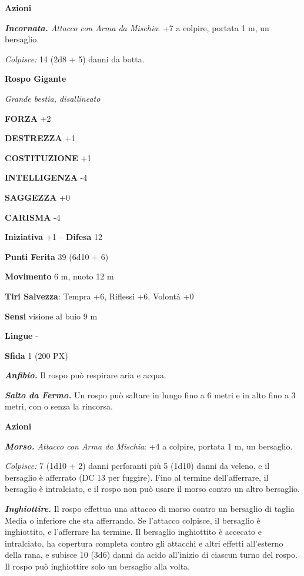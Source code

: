 \begin{multicols}{2}
\textbf{Azioni}

\textit{\textbf{Incornata.} Attacco con Arma da Mischia}: +7 a colpire, portata 1 m, un bersaglio.

\textit{Colpisce:} 14 (2d8 + 5) danni da botta.

\medskip\textbf{Rospo Gigante}

\textit{Grande bestia, disallineato}

\textbf{FORZA} +2

\textbf{DESTREZZA} +1

\textbf{COSTITUZIONE} +1

\textbf{INTELLIGENZA} -4

\textbf{SAGGEZZA} +0

\textbf{CARISMA} -4

\textbf{Iniziativa} +1 -- \textbf{Difesa} 12

\textbf{Punti Ferita} 39 (6d10 + 6)

\textbf{Movimento} 6 m, nuoto 12 m

\textbf{Tiri Salvezza}: Tempra +6, Riflessi +6, Volontà +0

\textbf{Sensi} visione al buio 9 m

\textbf{Lingue} -

\textbf{Sfida} 1 (200 PX)

\textit{\textbf{Anfibio.}} Il rospo può respirare aria e acqua.

\textit{\textbf{Salto da Fermo.}} Un rospo può saltare in lungo fino a 6 metri e in alto fino a 3 metri, con o senza la rincorsa.

\textbf{Azioni}

\textit{\textbf{Morso.} Attacco con Arma da Mischia}: +4 a colpire, portata 1 m, un bersaglio.

\textit{Colpisce:} 7 (1d10 + 2) danni perforanti più 5 (1d10) danni da veleno, e il bersaglio è afferrato (DC 13 per fuggire). Fino al termine dell'afferrare, il bersaglio è intralciato, e il rospo non può usare il morso contro un altro bersaglio.

\textit{\textbf{Inghiottire.}} Il rospo effettua una attacco di morso contro un bersaglio di taglia Media o inferiore che sta afferrando. Se l'attacco colpisce, il bersaglio è inghiottito, e l'afferrare ha termine. Il bersaglio inghiottito è accecato e intralciato, ha copertura completa contro gli attacchi e altri effetti all'esterno della rana, e subisce 10 (3d6) danni da acido all'inizio di ciascun turno del rospo. Il rospo può inghiottire solo un bersaglio alla volta.


\end{multicols}
